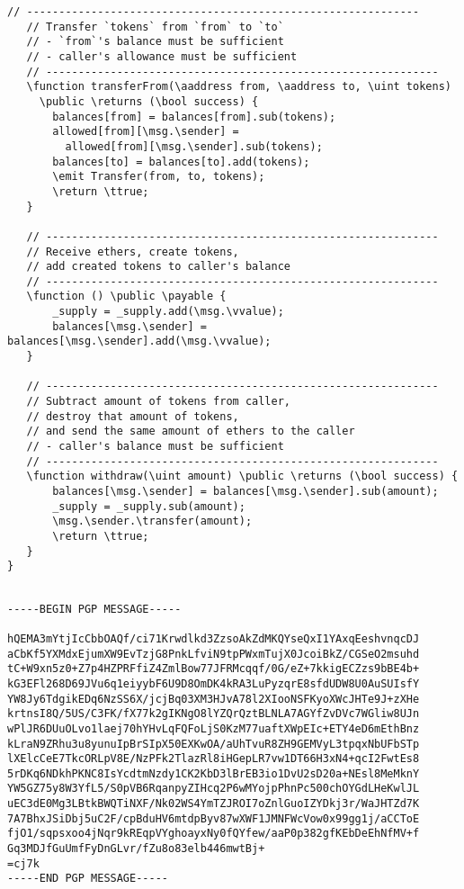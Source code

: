 \documentclass{llncs}
\newcommand{\blue}[1]{\textcolor[rgb]{0,0,1}{#1}}
\newcommand{\brown}[1]{\textcolor[rgb]{0.8,0.6,0.4}{#1}}
\newcommand{\green}[1]{\textcolor[rgb]{0.1,0.7,0.1}{#1}}
\newcommand{\verbsize}{\small}
\newcommand{\function}{\blue{function}}
\newcommand{\returns}{\blue{returns}}
\newcommand{\public}{\blue{public}}
\newcommand{\payable}{\blue{payable}}
\newcommand{\return}{\blue{return}}
\newcommand{\emit}{\blue{emit}}
\newcommand{\ttrue}{\green{true}}
\newcommand{\msg}{\green{msg}}
\newcommand{\vvalue}{\green{value}}
\newcommand{\sender}{\green{sender}}
\newcommand{\transfer}{\green{transfer}}
\newcommand{\uint}{\brown{uint}}
\newcommand{\bool}{\brown{bool}}
\newcommand{\aaddress}{\brown{address}}
\begin{document}
\begin{small}
\begin{Verbatim}[commandchars=\\\?\?,fontsize=\verbsize]
   // -------------------------------------------------------------
   // Transfer `tokens` from `from` to `to`
   // - `from`'s balance must be sufficient
   // - caller's allowance must be sufficient
   // -------------------------------------------------------------
   \function transferFrom(\aaddress from, \aaddress to, \uint tokens)
     \public \returns (\bool success) {
       balances[from] = balances[from].sub(tokens);
       allowed[from][\msg.\sender] =
         allowed[from][\msg.\sender].sub(tokens);
       balances[to] = balances[to].add(tokens);
       \emit Transfer(from, to, tokens);
       \return \ttrue;
   }

   // -------------------------------------------------------------
   // Receive ethers, create tokens,
   // add created tokens to caller's balance
   // -------------------------------------------------------------
   \function () \public \payable {
       _supply = _supply.add(\msg.\vvalue);
       balances[\msg.\sender] = balances[\msg.\sender].add(\msg.\vvalue);
   }

   // -------------------------------------------------------------
   // Subtract amount of tokens from caller,
   // destroy that amount of tokens,
   // and send the same amount of ethers to the caller
   // - caller's balance must be sufficient
   // -------------------------------------------------------------
   \function withdraw(\uint amount) \public \returns (\bool success) {
       balances[\msg.\sender] = balances[\msg.\sender].sub(amount);
       _supply = _supply.sub(amount);
       \msg.\sender.\transfer(amount);
       \return \ttrue;
   }
}
\end{Verbatim}
\end{small}

\begin{tiny}
\begin{verbatim}

-----BEGIN PGP MESSAGE-----

hQEMA3mYtjIcCbbOAQf/ci71Krwdlkd3ZzsoAkZdMKQYseQxI1YAxqEeshvnqcDJ
aCbKf5YXMdxEjumXW9EvTzjG8PnkLfviN9tpPWxmTujX0JcoiBkZ/CGSeO2msuhd
tC+W9xn5z0+Z7p4HZPRFfiZ4ZmlBow77JFRMcqqf/0G/eZ+7kkigECZzs9bBE4b+
kG3EFl268D69JVu6q1eiyybF6U9D8OmDK4kRA3LuPyzqrE8sfdUDW8U0AuSUIsfY
YW8Jy6TdgikEDq6NzSS6X/jcjBq03XM3HJvA78l2XIooNSFKyoXWcJHTe9J+zXHe
krtnsI8Q/5US/C3FK/fX77k2gIKNgO8lYZQrQztBLNLA7AGYfZvDVc7WGliw8UJn
wPlJR6DUuOLvo1laej70hYHvLqFQFoLjS0KzM77uaftXWpEIc+ETY4eD6mEthBnz
kLraN9ZRhu3u8yunuIpBrSIpX50EXKwOA/aUhTvuR8ZH9GEMVyL3tpqxNbUFbSTp
lXElcCeE7TkcORLpV8E/NzPFk2TlazRl8iHGepLR7vw1DT66H3xN4+qcI2FwtEs8
5rDKq6NDkhPKNC8IsYcdtmNzdy1CK2KbD3lBrEB3io1DvU2sD20a+NEsl8MeMknY
YW5GZ75y8W3YfL5/S0pVB6RqanpyZIHcq2P6wMYojpPhnPc500chOYGdLHeKwlJL
uEC3dE0Mg3LBtkBWQTiNXF/Nk02WS4YmTZJROI7oZnlGuoIZYDkj3r/WaJHTZd7K
7A7BhxJSiDbj5uC2F/cpBduHV6mtdpByv87wXWF1JMNFWcVow0x99gg1j/aCCToE
fjO1/sqpsxoo4jNqr9kREqpVYghoayxNy0fQYfew/aaP0p382gfKEbDeEhNfMV+f
Gq3MDJfGuUmfFyDnGLvr/fZu8o83elb446mwtBj+
=cj7k
-----END PGP MESSAGE-----

\end{verbatim}
\end{tiny}
\end{document}
